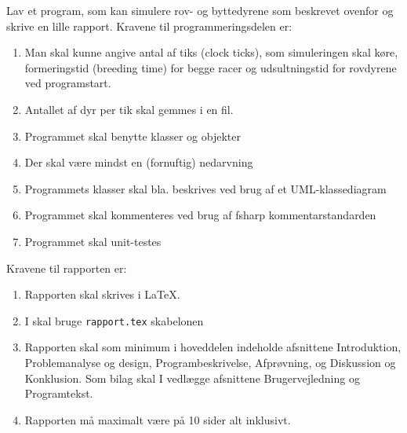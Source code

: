 Lav et program, som kan simulere rov- og byttedyrene som beskrevet ovenfor og skrive en lille rapport. Kravene til programmeringsdelen er:
\begin{enumerate}
\item Man skal kunne angive antal af tiks (clock ticks), som simuleringen skal køre, formeringstid (breeding time) for begge racer og udsultningstid for rovdyrene ved programstart.
\item Antallet af dyr per tik skal gemmes i en fil.
\item Programmet skal benytte klasser og objekter
\item Der skal være mindst en (fornuftig) nedarvning
\item Programmets klasser skal bla. beskrives ved brug af et UML-klassediagram
\item Programmet skal kommenteres ved brug af fsharp kommentarstandarden
\item Programmet skal unit-testes
\end{enumerate}
Kravene til rapporten er:
\begin{enumerate}[resume]
\item Rapporten skal skrives i \LaTeX.
\item I skal bruge \texttt{rapport.tex} skabelonen
\item Rapporten skal som minimum i hoveddelen indeholde afsnittene Introduktion, Problemanalyse og design, Programbeskrivelse, Afprøvning, og Diskussion og Konklusion. Som bilag skal I vedlægge afsnittene Brugervejledning og Programtekst.
\item Rapporten må maximalt være på 10 sider alt inklusivt.
\end{enumerate}
